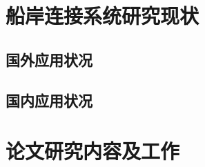 \begin{table}[!htp]
	\centering
	\caption[中国岸电替代辅机发电的减排表现]{中国岸电替代辅机发电的减排表现\cite{SP3}}
	\label{tab:岸电替代效益}
\end{table}





\section{船岸连接系统研究现状}

\zhlipsum[5]

\subsection{国外应用状况}
\zhlipsum[6]
\subsection{国内应用状况}
\zhlipsum[7]
\section{论文研究内容及工作}
\zhlipsum[8]
